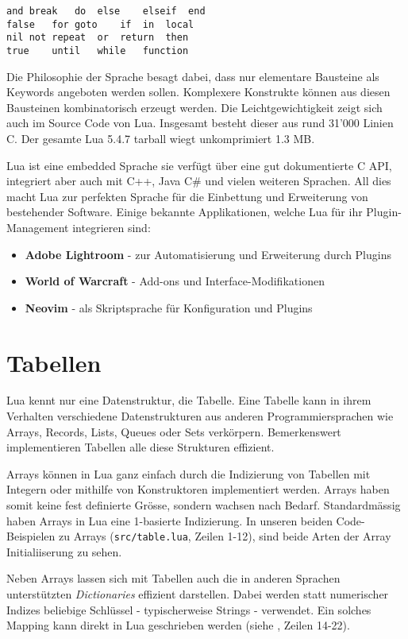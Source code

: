 \documentclass[11pt,a4paper]{article}
\begin{document}
\begin{lstlisting}
and	break	do	else	elseif	end
false	for	goto 	if	in	local
nil	not	repeat	or	return	then
true	until	while	function
\end{lstlisting}

Die Philosophie der Sprache besagt dabei, dass nur elementare Bausteine als Keywords angeboten werden sollen. Komplexere Konstrukte können aus diesen Bausteinen kombinatorisch erzeugt werden. Die Leichtgewichtigkeit zeigt sich auch im Source Code von Lua. Insgesamt besteht dieser aus rund 31’000 Linien C. Der gesamte Lua 5.4.7 tarball wiegt unkomprimiert 1.3 MB.

Lua ist eine embedded Sprache sie verfügt über eine gut dokumentierte C API, integriert aber auch mit C++, Java C\# und vielen weiteren Sprachen. All dies macht Lua zur perfekten Sprache für die Einbettung und Erweiterung von bestehender Software.
Einige bekannte Applikationen, welche Lua für ihr Plugin-Management integrieren sind:

\begin{itemize}
  \item \textbf{Adobe Lightroom} - zur Automatisierung und Erweiterung durch Plugins
  \item \textbf{World of Warcraft} - Add-ons und Interface-Modifikationen
  \item \textbf{Neovim} - als Skriptsprache für Konfiguration und Plugins
\end{itemize}

\section*{Tabellen}

Lua kennt nur eine Datenstruktur, die Tabelle. Eine Tabelle kann in ihrem Verhalten verschiedene Datenstrukturen aus anderen Programmiersprachen wie Arrays, Records, Lists, Queues oder Sets verkörpern.
Bemerkenswert implementieren Tabellen alle diese Strukturen effizient.

Arrays können in Lua ganz einfach durch die Indizierung von Tabellen mit Integern oder mithilfe von Konstruktoren implementiert werden. 
Arrays haben somit keine fest definierte Grösse, sondern wachsen nach Bedarf.
Standardmässig haben Arrays in Lua eine 1-basierte Indizierung. 
In unseren beiden Code-Beispielen zu Arrays (\texttt{src/table.lua}, Zeilen 1-12), sind beide Arten der Array Initialiiserung zu sehen.

Neben Arrays lassen sich mit Tabellen auch die in anderen Sprachen unterstützten \textit{Dictionaries} effizient darstellen. 
Dabei werden statt numerischer Indizes beliebige Schlüssel - typischerweise Strings - verwendet.
Ein solches Mapping kann direkt in Lua geschrieben werden (siehe , Zeilen 14-22).
\end{document}
